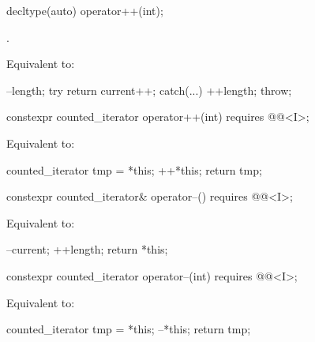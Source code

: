 %
\begin{itemdecl}
decltype(auto) operator++(int);
\end{itemdecl}

\begin{itemdescr}
\pnum
\expects
{}.

\pnum
\effects
Equivalent to:
\begin{codeblock}
--length;
try { return current++; }
catch(...) { ++length; throw; }
\end{codeblock}
\end{itemdescr}

%
\begin{itemdecl}
constexpr counted_iterator operator++(int)
  requires @@<I>;
\end{itemdecl}

\begin{itemdescr}
\pnum
\effects
Equivalent to:
\begin{codeblock}
counted_iterator tmp = *this;
++*this;
return tmp;
\end{codeblock}
\end{itemdescr}

%
\begin{itemdecl}
  constexpr counted_iterator& operator--()
    requires @@<I>;
\end{itemdecl}

\begin{itemdescr}
\pnum
\effects
Equivalent to:
\begin{codeblock}
--current;
++length;
return *this;
\end{codeblock}
\end{itemdescr}

%
\begin{itemdecl}
  constexpr counted_iterator operator--(int)
    requires @@<I>;
\end{itemdecl}

\begin{itemdescr}
\pnum
\effects
Equivalent to:
\begin{codeblock}
counted_iterator tmp = *this;
--*this;
return tmp;
\end{codeblock}
\end{itemdescr}

